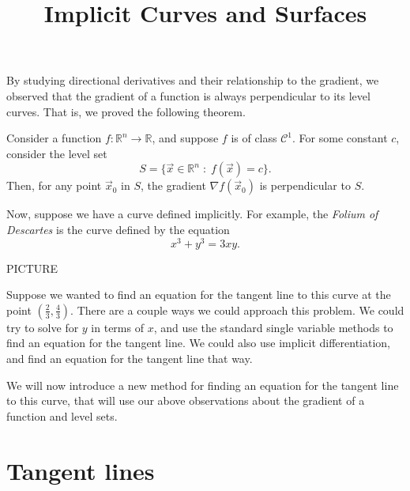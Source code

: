 \documentclass{ximera}
\title{Implicit Curves and Surfaces}
\begin{document}
\begin{abstract}
\end{abstract}
\maketitle

By studying directional derivatives and their relationship to the gradient, we observed that the gradient of a function is always perpendicular to its level curves.  That is, we proved the following theorem.

\begin{theorem}
Consider a function $f:\mathbb{R}^n\rightarrow\mathbb{R}$, and suppose $f$ is of class $\mathcal{C}^1$. For some constant $c$, consider the level set
\[
S = \{\vec{x}\in\mathbb{R}^n\;:\;f(\vec{x})=c\}.
\]
Then, for any point $\vec{x}_0$ in $S$, the gradient $\nabla f(\vec{x}_0)$ is perpendicular to $S$.
\end{theorem}

Now, suppose we have a curve defined implicitly. For example, the \emph{Folium of Descartes} is the curve defined by the equation
\[
x^3+y^3=3xy.
\]

PICTURE

Suppose we wanted to find an equation for the tangent line to this curve at the point $\left(\frac{2}{3}, \frac{4}{3}\right)$. There are a couple ways we could approach this problem. We could try to solve for $y$ in terms of $x$, and use the standard single variable methods to find an equation for the tangent line. We could also use implicit differentiation, and find an equation for the tangent line that way.

We will now introduce a new method for finding an equation for the tangent line to this curve, that will use our above observations about the gradient of a function and level sets.

\section*{Tangent lines}
\end{document}
